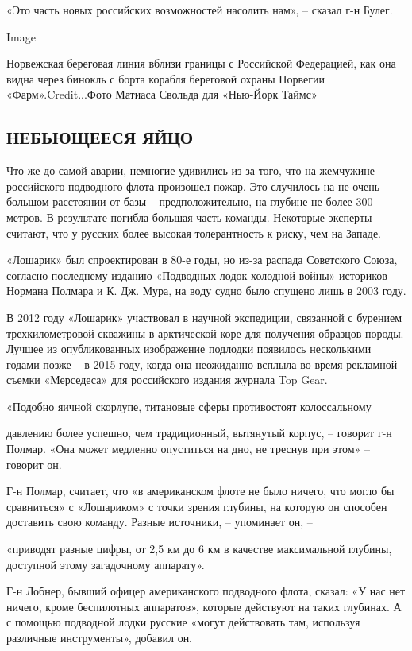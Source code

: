 «Это часть новых российских возможностей насолить нам», -- сказал г-н
Булег.

Image

Норвежская береговая линия вблизи границы с Российской Федерацией, как
она видна через бинокль с борта корабля береговой охраны Норвегии
«Фарм».Credit...Фото Матиаса Свольда для «Нью-Йорк Таймс»

\hypertarget{ux43dux435ux431ux44cux44eux449ux435ux435ux441ux44f-ux44fux439ux446ux43e}{%
\subsection{НЕБЬЮЩЕЕСЯ
ЯЙЦО}\label{ux43dux435ux431ux44cux44eux449ux435ux435ux441ux44f-ux44fux439ux446ux43e}}

Что же до самой аварии, немногие удивились из-за того, что на жемчужине
российского подводного флота произошел пожар. Это случилось на не очень
большом расстоянии от базы -- предположительно, на глубине не более 300
метров. В результате погибла большая часть команды. Некоторые эксперты
считают, что у русских более высокая толерантность к риску, чем на
Западе.

«Лошарик» был спроектирован в 80-е годы, но из-за распада Советского
Союза, согласно последнему изданию «Подводных лодок холодной войны»
историков Нормана Полмара и К. Дж. Мура, на воду судно было спущено лишь
в 2003 году.

В 2012 году «Лошарик» участвовал в научной экспедиции, связанной с
бурением трехкилометровой скважины в арктической коре для получения
образцов породы. Лучшее из опубликованных изображение подлодки появилось
несколькими годами позже -- в 2015 году, когда она неожиданно всплыла во
время рекламной съемки «Мерседеса» для российского издания журнала Top
Gear.

«Подобно яичной скорлупе, титановые сферы противостоят колоссальному

давлению более успешно, чем традиционный, вытянутый корпус, -- говорит
г-н Полмар. «Она может медленно опуститься на дно, не треснув при этом»
-- говорит он.

Г-н Полмар, считает, что «в американском флоте не было ничего, что могло
бы сравниться» с «Лошариком» с точки зрения глубины, на которую он
способен доставить свою команду. Разные источники, -- упоминает он, --

«приводят разные цифры, от 2,5 км до 6 км в качестве максимальной
глубины, доступной этому загадочному аппарату».

Г-н Лобнер, бывший офицер американского подводного флота, сказал: «У нас
нет ничего, кроме беспилотных аппаратов», которые действуют на таких
глубинах. А с помощью подводной лодки русские «могут действовать там,
используя различные инструменты», добавил он.

